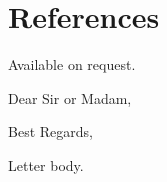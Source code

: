 \documentclass[10pt,letterpaper,roman]{moderncv}
\begin{document}
\section{References}
Available on request.

\nocite{*}



\clearpage
\date{\today}
\opening{Dear Sir or Madam,}
\closing{Best Regards,}
\makelettertitle

Letter body.



\makeletterclosing
\end{document}
